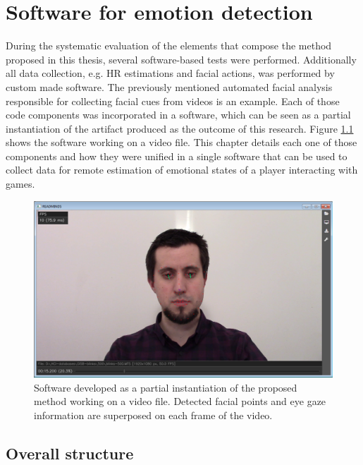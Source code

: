 \chapter{Software for emotion detection}
\label{ch:software}

During the systematic evaluation of the elements that compose the method proposed in this thesis, several software-based tests were performed. Additionally all data collection, e.g. HR estimations and facial actions, was performed by custom made software. The previously mentioned automated facial analysis responsible for collecting facial cues from videos is an example. Each of those code components was incorporated in a software, which can be seen as a partial instantiation of the artifact produced as the outcome of this research. Figure \ref{fig:readmind-main-window} shows the software working on a video file. This chapter details each one of those components and how they were unified in a single software that can be used to collect data for remote estimation of emotional states of a player interacting with games.

\begin{figure}[h!]
    \centering
    \includegraphics[width=\textwidth]{figures/tool-main-window.png}
    \caption{Software developed as a partial instantiation of the proposed method working on a video file. Detected facial points and eye gaze information are superposed on each frame of the video.}
    \label{fig:readmind-main-window}
\end{figure}

\section{Overall structure}

